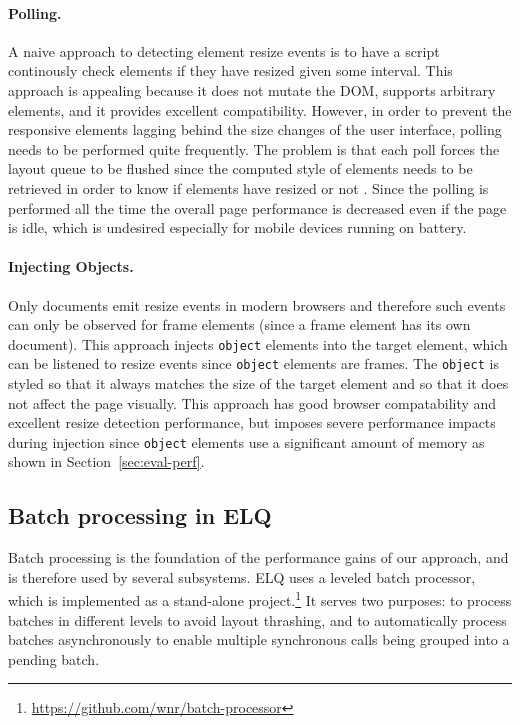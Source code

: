 \documentclass[]{llncs}
\newcommand{\code}[1]{\texttt{#1}}
\newcommand{\elq}{ELQ}
\begin{document}
    \paragraph{Polling.}
    A naive approach to detecting element resize events is to have a script continously check elements if they have resized given some interval.
    This approach is appealing because it does not mutate the DOM, supports arbitrary elements, and it provides excellent compatibility.
    However, in order to prevent the responsive elements lagging behind the size changes of the user interface, polling needs to be performed quite frequently.
    The problem is that each poll forces the layout queue to be flushed since the computed style of elements needs to be retrieved in order to know if elements have resized or not \cite{elq-thesis}.
    Since the polling is performed all the time the overall page performance is decreased even if the page is idle, which is undesired especially for mobile devices running on battery.

    \paragraph{Injecting Objects.}
    Only documents emit resize events in modern browsers and therefore such events can only be observed for frame elements (since a frame element has its own document).
    This approach injects \code{object} elements into the target element, which can be listened to resize events since \code{object} elements are frames.
    The \code{object} is styled so that it always matches the size of the target element and so that it does not affect the page visually.
    This approach has good browser compatability and excellent resize detection performance, but imposes severe performance impacts during injection since \code{object} elements use a significant amount of memory as shown in Section~\ref{sec:eval-perf}.

  \subsection{Batch processing in ELQ}\label{sec:imp_batch_processor}
    Batch processing is the foundation of the performance gains of our approach, and is therefore used by several subsystems.
    \elq{} uses a leveled batch processor, which is implemented as a stand-alone project.\footnote{\url{https://github.com/wnr/batch-processor}}
    It serves two purposes: to process batches in different levels to avoid layout thrashing, and to automatically process batches asynchronously to enable multiple synchronous calls being grouped into a pending batch.
\end{document}
